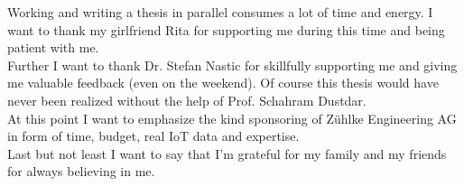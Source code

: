 \documentclass[draft,final]{vutinfth} %
\begin{document}
\frontmatter %

\addstatementpage

\begin{acknowledgements*}
Working and writing a thesis in parallel consumes a lot of time and energy.
I want to thank my girlfriend Rita for supporting me during this time and being patient with me.\\
Further I want to thank Dr. Stefan Nastic for skillfully supporting me and giving me valuable feedback (even on the weekend).
Of course this thesis would have never been realized without the help of Prof. Schahram Dustdar.\\
At this point I want to emphasize the kind sponsoring of Zühlke Engineering AG in form of time, budget, real IoT data and expertise.\\
Last but not least I want to say that I'm grateful for my family and my friends for always believing in me.
\end{acknowledgements*}
\end{document}
